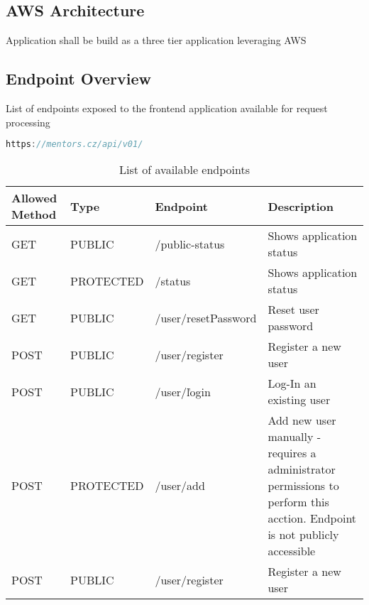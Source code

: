 \documentclass{article}
\begin{document}
\subsection{AWS Architecture}
Application shall be build as a three tier application leveraging AWS

\subsection{Endpoint Overview}
List of endpoints exposed to the frontend application available for request processing

\begin{lstlisting}[language=Java, caption=Backend Application base path]
        https://mentors.cz/api/v01/
\end{lstlisting}

\begin{table}[ht]
    \centering
    \begin{tabular}{|L{2cm}|L{2cm}|L{6cm}|L{6cm}|}
        \hline
        Allowed Method&Type&Endpoint&Description \\ \hline
        GET&PUBLIC&/public-status&Shows application status \\ \hline

        GET&PROTECTED&/status&Shows application status \\ \hline
        GET&PUBLIC&/user/resetPassword&Reset user password \\ \hline

        POST&PUBLIC&/user/register&Register a new user  \\ \hline
        POST&PUBLIC&/user/ľogin&Log-In an existing user \\ \hline
        POST&PROTECTED&/user/add&Add new user manually - requires a administrator permissions to perform this acction. Endpoint is not publicly accessible  \\ \hline
        POST&PUBLIC&/user/register&Register a new user  \\ \hline

    \end{tabular}
    \caption{List of available endpoints}
\end{table}
\end{document}
